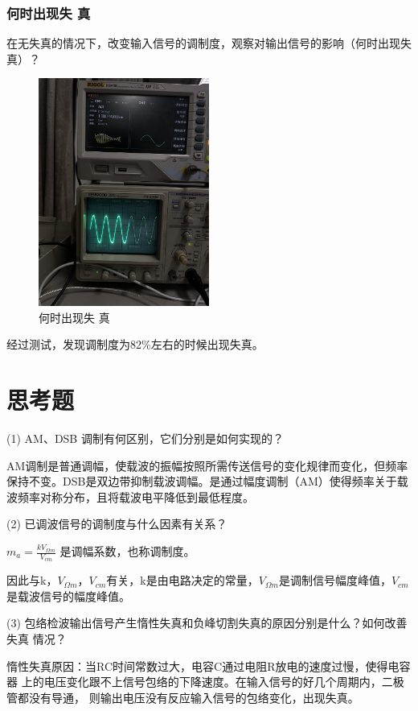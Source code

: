 \documentclass{../source/Experiment}
\begin{document}
\subsubsection{何时出现失
真}
在无失真的情况下，改变输入信号的调制度，观察对输出信号的影响（何时出现失
真）？
\begin{figure}[H]
    \centering
    \includegraphics[width = 0.5\textwidth,angle=270]{lab6/8.jpg}
    \caption{何时出现失
    真}
    
\end{figure}

经过测试，发现调制度为82\%左右的时候出现失真。

\section{思考题}
(1) AM、DSB 调制有何区别，它们分别是如何实现的？

AM调制是普通调幅，使载波的振幅按照所需传送信号的变化规律而变化，但频率保持不变。DSB是双边带抑制载波调幅。是通过幅度调制（AM）使得频率关于载波频率对称分布，且将载波电平降低到最低程度。


(2) 已调波信号的调制度与什么因素有关系？

$m_{a}=\frac{k V_{\Omega m}}{V_{c m}}$ 是调幅系数，也称调制度。

因此与k，$V_{\Omega m}，V_{c m}$有关，k是由电路决定的常量，$V_{\Omega m}$是调制信号幅度峰值，$V_{c m}$是载波信号的幅度峰值。


(3) 包络检波输出信号产生惰性失真和负峰切割失真的原因分别是什么？如何改善失真
情况？

惰性失真原因：当RC时间常数过大，电容C通过电阻R放电的速度过慢，使得电容器
上的电压变化跟不上信号包络的下降速度。在输入信号的好几个周期内，二极管都没有导通，
则输出电压没有反应输入信号的包络变化，出现失真。
\end{document}
